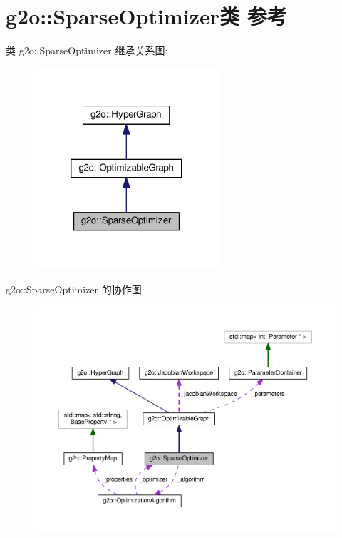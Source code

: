 \hypertarget{classg2o_1_1SparseOptimizer}{\section{g2o\-:\-:Sparse\-Optimizer类 参考}
\label{classg2o_1_1SparseOptimizer}
}


类 g2o\-:\-:Sparse\-Optimizer 继承关系图\-:
\nopagebreak
\begin{figure}[H]
\begin{center}
\leavevmode
\includegraphics[width=194pt]{classg2o_1_1SparseOptimizer__inherit__graph}
\end{center}
\end{figure}


g2o\-:\-:Sparse\-Optimizer 的协作图\-:
\nopagebreak
\begin{figure}[H]
\begin{center}
\leavevmode
\includegraphics[width=350pt]{classg2o_1_1SparseOptimizer__coll__graph}
\end{center}
\end{figure}
